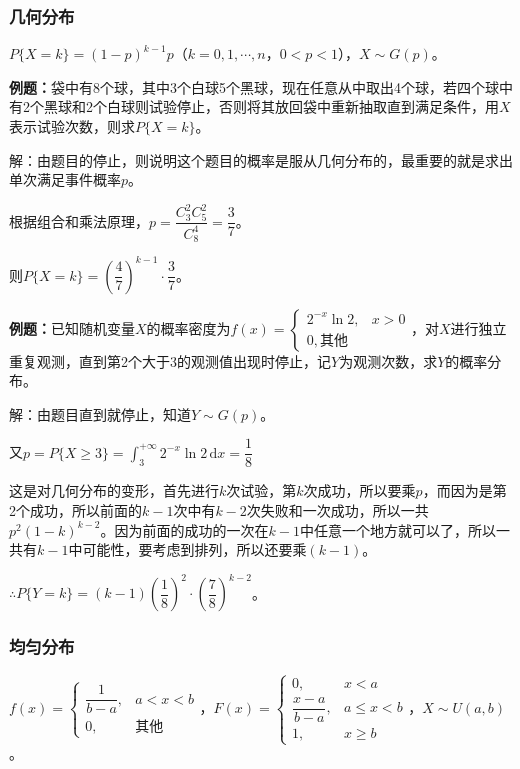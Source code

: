 \subsubsection{几何分布}

$P\{X=k\}=(1-p)^{k-1}p$（$k=0,1,\cdots,n$，$0<p<1$），$X\sim G(p)$。

\textbf{例题：}袋中有8个球，其中3个白球5个黑球，现在任意从中取出4个球，若四个球中有2个黑球和2个白球则试验停止，否则将其放回袋中重新抽取直到满足条件，用$X$表示试验次数，则求$P\{X=k\}$。

解：由题目的停止，则说明这个题目的概率是服从几何分布的，最重要的就是求出单次满足事件概率$p$。

根据组合和乘法原理，$p=\dfrac{C_3^2C_5^2}{C_8^4}=\dfrac{3}{7}$。

则$P\{X=k\}=\left(\dfrac{4}{7}\right)^{k-1}\cdot\dfrac{3}{7}$。

\textbf{例题：}已知随机变量$X$的概率密度为$f(x)=\left\{\begin{array}{ll}
    2^{-x}\ln2, & x>0 \\
    0, \text{其他}
\end{array}\right.$，对$X$进行独立重复观测，直到第2个大于3的观测值出现时停止，记$Y$为观测次数，求$Y$的概率分布。

解：由题目直到就停止，知道$Y\sim G(p)$。

又$p=P\{X\geqslant3\}=\int_3^{+\infty}2^{-x}\ln2\,\textrm{d}x=\dfrac{1}{8}$

这是对几何分布的变形，首先进行$k$次试验，第$k$次成功，所以要乘$p$，而因为是第2个成功，所以前面的$k-1$次中有$k-2$次失败和一次成功，所以一共$p^2(1-k)^{k-2}$。因为前面的成功的一次在$k-1$中任意一个地方就可以了，所以一共有$k-1$中可能性，要考虑到排列，所以还要乘$(k-1)$。

$\therefore P\{Y=k\}=(k-1)\left(\dfrac{1}{8}\right)^2\cdot\left(\dfrac{7}{8}\right)^{k-2}$。

\subsubsection{均匀分布}

$f(x)=\left\{\begin{array}{ll}
    \dfrac{1}{b-a}, & a<x<b \\
    0, & \text{其他}
\end{array}\right.$，$F(x)=\left\{\begin{array}{ll}
    0, & x<a \\
    \dfrac{x-a}{b-a}, & a\leqslant x<b \\
    1, & x\geqslant b
\end{array}\right.$，$X\sim U(a,b)$。

